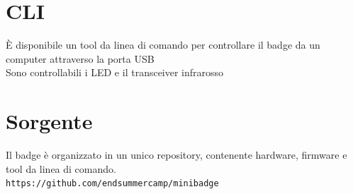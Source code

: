 \documentclass[10pt]{datasheet}
\begin{document}
\section{CLI}
È disponibile un tool da linea di comando per controllare il badge da un computer attraverso la porta USB \\
Sono controllabili i LED e il transceiver infrarosso
\vspace*{-5pt}
\section{Sorgente}
Il badge è organizzato in un unico repository, contenente hardware, firmware e tool da linea di comando.\\

\texttt{https://github.com/endsummercamp/minibadge}
	
\end{document}
